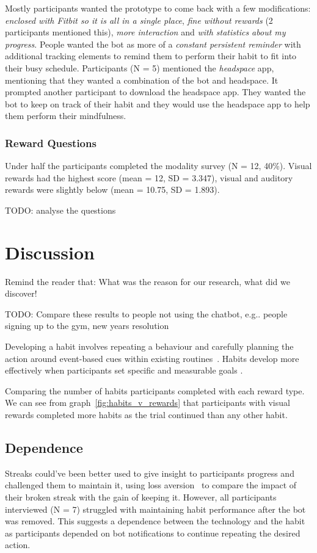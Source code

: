 \documentclass{scaffold/sigchi}
\begin{document}
Mostly participants wanted the prototype to come back with a few modifications: \textit{enclosed with Fitbit so it is all in a single place}, \textit{fine without rewards} (2 participants mentioned this), \textit{more interaction} and \textit{with statistics about my progress}. People wanted the bot as more of a \textit{constant persistent reminder} with additional tracking elements to remind them to perform their habit to fit into their busy schedule. Participants (N = 5) mentioned the \textit{headspace}\cite{headspace_app} app, mentioning that they wanted a combination of the bot and headspace. It prompted another participant to download the headspace app. They wanted the bot to keep on track of their habit and they would use the headspace app to help them perform their mindfulness.


\subsubsection{Reward Questions}
Under half the participants completed the modality survey (N = 12, 40\%). Visual rewards had the highest score (mean = 12, SD = 3.347), visual and auditory rewards were slightly below (mean = 10.75, SD = 1.893).

TODO: analyse the questions

\section{Discussion}
Remind the reader that: What was the reason for our research, what did we discover!

TODO: Compare these results to people not using the chatbot, e.g.. people signing up to the gym, new years resolution

Developing a habit involves repeating a behaviour and carefully planning the action around event-based cues within existing routines~\cite{habits_event_cues_1, habits_event_cues_2}. Habits develop more effectively when participants set specific and measurable goals \cite{habits_better_when_have_specific_and_measurable_goals}.


Comparing the number of habits participants completed with each reward type. We can see from graph~\ref{fig:habits_v_rewards} that participants with visual rewards completed more habits as the trial continued than any other habit.  


\subsection{Dependence}
Streaks could've been better used to give insight to participants progress and challenged them to maintain it, using loss aversion~\cite{loss_aversion} to compare the impact of their broken streak with the gain of keeping it. However, all participants interviewed (N = 7) struggled with maintaining habit performance after the bot was removed. This suggests a dependence between the technology and the habit as participants depended on bot notifications to continue repeating the desired action.
\end{document}

